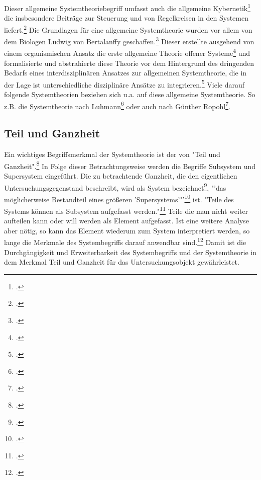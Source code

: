 \documentclass[a4paper,12pt]{article}
\begin{document}
Dieser allgemeine Systemtheoriebegriff umfasst auch die allgemeine Kybernetik\footcite[S. 102]{Ulrich1968} die insbesondere Beiträge zur Steuerung und von Regelkreisen in den Systemen liefert.\footcite[S. 50]{Ulrich2016} Die Grundlagen für eine allgemeine Systemtheorie wurden vor allem von dem Biologen Ludwig von Bertalanffy geschaffen.\footcite[S. 102]{Ulrich1968} Dieser erstellte ausgehend von einem organismischen Ansatz die erste allgemeine Theorie offener Systeme\footcite[S. 70]{Diesner2015} und formalisierte und abstrahierte diese Theorie vor dem Hintergrund des dringenden Bedarfs eines interdisziplinären Ansatzes zur allgemeinen Systemtheorie, die in der Lage ist unterschiedliche disziplinäre Ansätze zu integrieren.\footcite[S. 71]{Diesner2015} Viele darauf folgende Systemtheorien beziehen sich u.a. auf diese allgemeine Systemtheorie. So z.B. die Systemtheorie nach Luhmann\footcite[S. 15]{Luhmann1999} oder auch nach Günther Ropohl\footcite[S. 70]{Ropohl2009}.

\subsection{Teil und Ganzheit}\label{teilganzheit}
Ein wichtiges Begriffsmerkmal der Systemtheorie ist der von "Teil und Ganzheit".\footcite[S. 107]{Ulrich1968} In Folge dieser Betrachtungsweise werden die Begriffe Subsystem und Supersystem eingeführt. Die zu betrachtende Ganzheit, die den eigentlichen Untersuchungsgegenstand beschreibt, wird als System bezeichnet\footcite[S. 107]{Ulrich1968}, "'das möglicherweise Bestandteil eines größeren 'Supersystems'"'\footcite[107]{Ulrich1968} ist. "Teile des Systems können als Subsystem aufgefasst werden."\footcite[S. 107]{Ulrich1968} Teile die man nicht weiter aufteilen kann oder will werden als Element aufgefasst. Ist eine weitere Analyse aber nötig, so kann das Element wiederum zum System interpretiert werden, so lange die Merkmale des Systembegriffs darauf anwendbar sind.\footcite[S. 107]{Ulrich1968} Damit ist die Durchgängigkeit und Erweiterbarkeit des Systembegriffs und der Systemtheorie in dem Merkmal Teil und Ganzheit für das Untersuchungsobjekt gewährleistet. 
\end{document}
